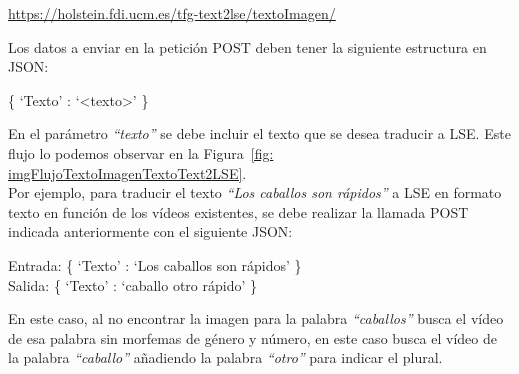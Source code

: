 \begin{shaded}
	\url{https://holstein.fdi.ucm.es/tfg-text2lse/textoImagen/  }	
\end{shaded}


Los datos a enviar en la petición POST deben tener la siguiente estructura en JSON: 
\begin{center}
	
	\{ `Texto' : `<texto>' \}
	
\end{center}


En el parámetro \textit{``texto''} se debe incluir el texto que se desea traducir a LSE. Este flujo lo podemos observar en la Figura~\ref {fig: imgFlujoTextoImagenTextoText2LSE}.\\

Por ejemplo, para traducir el texto \textit{``Los caballos son rápidos''} a LSE en formato texto en función de los vídeos existentes, se debe realizar la llamada POST indicada anteriormente con el siguiente JSON:


\begin{center}
	Entrada: \{ `Texto' : `Los caballos son rápidos' \} \\
	Salida: \{ `Texto' : `caballo otro rápido' \}
\end{center}

En este caso, al no encontrar la imagen para la palabra \textit{``caballos''} busca el vídeo de esa palabra sin morfemas de género y número, en este caso busca el vídeo de la palabra \textit{``caballo''} añadiendo la palabra  \textit{``otro''} para indicar el plural.



